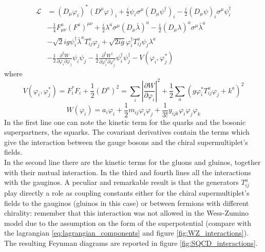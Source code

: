 \documentclass[12pt]{article}
\begin{document}
\begin{equation}
  \begin{aligned}
      \mathcal{L} &=\left(D_{\mu} \varphi_{i}\right)^{*}\left(D^{\mu} \varphi\right)_{i}+\frac{i}{2} \psi_{i} \sigma^{\mu}\left(D_{\mu} \psi^{\dagger}\right)_{i}-\frac{i}{2}\left(D_{\mu} \psi\right)_{i} \sigma^{\mu} \psi^{\dagger}_{i}\\
      &-\frac{1}{4} F_{\mu \nu}^{a}\left(F^{a}\right)^{\mu \nu}+\frac{i}{2} \lambda^{a} \sigma^{\mu}\left(D_{\mu} \bar{\lambda}\right)^{a}-\frac{i}{2}\left(D_{\mu} \lambda\right)^{a} \sigma^{\mu} \bar{\lambda}^{a} \\
      &-\sqrt{2} i g \psi^{\dagger}_{i} \bar{\lambda}^{a} T_{i j}^{a} \varphi_{j}+\sqrt{2 i g} \varphi_{i}^{\dagger} T_{i j}^{a} \psi_{j} \lambda^{a} \\
      &-\frac{1}{2} \frac{\partial^{2} W}{\partial \varphi_{i} \partial \varphi_{j}} \psi_{i} \psi_{j}-\frac{1}{2} \frac{\partial^{2} W^{\dagger}}{\partial \varphi_{i}^{*} \partial \varphi_{j}^{*}} \psi^{\dagger}_{i} \psi^{\dagger}_{j}-V\left(\varphi_{i}, \varphi_{j}^{*}\right)
      \end{aligned}
  \label{eq:SQCD}
\end{equation}
where 
\begin{equation*}
    V\left(\varphi_{i}, \varphi_{j}^{*}\right)=F_{i}^{*} F_{i}+\frac{1}{2}\left(D^{a}\right)^{2}=\sum_{i}\left|\frac{\partial W}{\partial \varphi_{i}}\right|^{2}+\frac{1}{2} \sum_{a}\left(g \varphi_{i}^{*} T_{i j}^{a} \varphi_{j}+k^{a}\right)^{2}
\end{equation*}
\begin{equation*}
    W\left(\varphi_{i}\right)=a_{i} \varphi_{i}+\frac{1}{2} m_{i j} \varphi_{i} \varphi_{j}+\frac{1}{3 !} y_{i j k} \varphi_{i} \varphi_{j} \varphi_{k}
\end{equation*}
In the first line one can note the kinetic term for the quarks and the bosonic superpartners, the squarks. The covariant derivatives contain the terms which give the interaction between the gauge bosons and the chiral supermultiplet's fields. \\
In the second line there are the kinetic terms for the gluons and gluinos, together with their mutual interaction. In the third and fourth lines all the interactions with the gauginos. A peculiar and remarkable result is that the generators $T^a_{ij}$ play directly 
a role as coupling constants either for the chiral supermultiplet's fields to the gauginos (gluinos in this case) or between fermions with different chirality: remember that this interaction was not allowed in the Wess-Zumino model due to the assumption on the form of the superpotential (compare with the lagrangian \ref{eq:lagrangian_components} and figure \ref{fig:WZ_interactions}). \\
The resulting Feynman diagrams are reported in figure \ref{fig:SQCD_interactions}. \par
\vfill
\newpage
\end{document}
